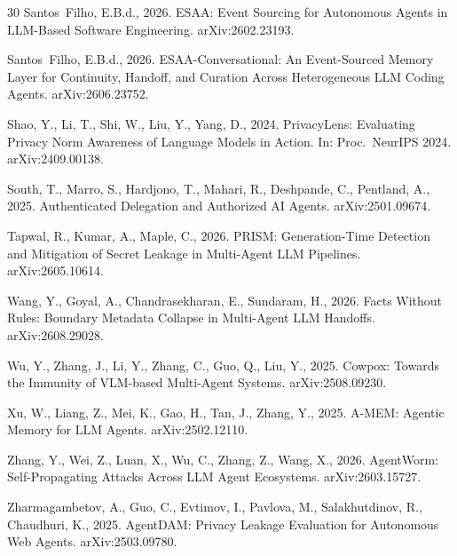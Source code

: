 \documentclass{article}
\begin{document}
\begin{thebibliography}{30}
Santos~Filho, E.B.d., 2026{}. ESAA: Event Sourcing for Autonomous Agents in LLM-Based Software Engineering. arXiv:2602.23193.

Santos~Filho, E.B.d., 2026{}. ESAA-Conversational: An Event-Sourced Memory Layer for Continuity, Handoff, and Curation Across Heterogeneous LLM Coding Agents. arXiv:2606.23752.

Shao, Y., Li, T., Shi, W., Liu, Y., Yang, D., 2024. PrivacyLens: Evaluating Privacy Norm Awareness of Language Models in Action. In: Proc.\ NeurIPS 2024. arXiv:2409.00138.

South, T., Marro, S., Hardjono, T., Mahari, R., Deshpande, C., Pentland, A., 2025. Authenticated Delegation and Authorized AI Agents. arXiv:2501.09674.

Tapwal, R., Kumar, A., Maple, C., 2026. PRISM: Generation-Time Detection and Mitigation of Secret Leakage in Multi-Agent LLM Pipelines. arXiv:2605.10614.

Wang, Y., Goyal, A., Chandrasekharan, E., Sundaram, H., 2026. Facts Without Rules: Boundary Metadata Collapse in Multi-Agent LLM Handoffs. arXiv:2608.29028.

Wu, Y., Zhang, J., Li, Y., Zhang, C., Guo, Q., Liu, Y., 2025. Cowpox: Towards the Immunity of VLM-based Multi-Agent Systems. arXiv:2508.09230.

Xu, W., Liang, Z., Mei, K., Gao, H., Tan, J., Zhang, Y., 2025. A-MEM: Agentic Memory for LLM Agents. arXiv:2502.12110.

Zhang, Y., Wei, Z., Luan, X., Wu, C., Zhang, Z., Wang, X., 2026. AgentWorm: Self-Propagating Attacks Across LLM Agent Ecosystems. arXiv:2603.15727.

Zharmagambetov, A., Guo, C., Evtimov, I., Pavlova, M., Salakhutdinov, R., Chaudhuri, K., 2025. AgentDAM: Privacy Leakage Evaluation for Autonomous Web Agents. arXiv:2503.09780.

\end{thebibliography}

\appendix
\end{document}
